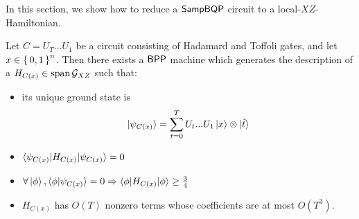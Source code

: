 In this section, we show how to reduce a $\operatorname{\mathsf{SampBQP}}$ circuit to a  local-$XZ$-Hamiltonian.

\begin{thm}
	Let $C=U_T\ldots U_1$ be a circuit consisting of Hadamard and Toffoli gates, and let $x\in\set{0, 1}^n$. Then there exists a $\operatorname{\mathsf{BPP}}$  machine which generates the  description of a $H_{C(x)}\in\operatorname*{\operatorname{span}}\mathcal{G}_{XZ}$ such that:
	\begin{itemize}
		\item its unique ground state is $$\ket{\psi_{C(x)}}=\sum_{t=0}^TU_t...U_1\ket{x}\otimes\ket{\hat{t}}$$
		\item $\braket{\psi_{C(x)}|H_{C(x)}|\psi_{C(x)}}=0$
		\item $\forall\ket\phi,\braket{\phi|\psi_{C(x)}}=0\Rightarrow\braket{\phi|H_{C(x)}|\phi}\geq\frac{3}{4}$
		\item $H_{C(x)}$ has $O(T)$ nonzero terms whose coefficients are  at most $O(T^3)$.
	\end{itemize}
\end{thm}

